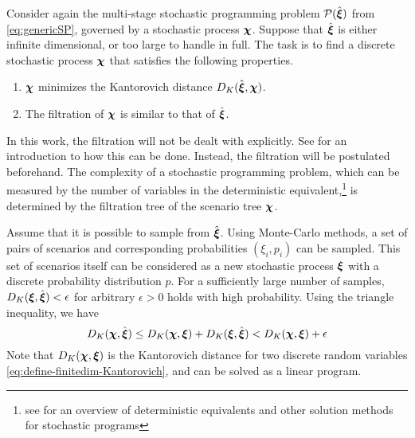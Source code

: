 Consider again the multi-stage stochastic programming problem $\mathcal{P}(\hat{\boldsymbol\xi})$ from \eqref{eq:genericSP}, governed by a stochastic process $\boldsymbol\chi$.
Suppose that $\hat{\boldsymbol\xi}$ is either infinite dimensional, or too large to handle in full.
The task is to find a discrete stochastic process $\boldsymbol\chi$ that satisfies the following properties.
\begin{enumerate}
\item $\boldsymbol\chi$ minimizes the Kantorovich distance $D_K(\hat{\boldsymbol\xi},\boldsymbol\chi)$.
\item The filtration of $\boldsymbol\chi$ is similar to that of $\hat{\boldsymbol\xi}$.
\end{enumerate}
In this work, the filtration will not be dealt with explicitly.
See  for an introduction to how this can be done.
Instead, the filtration will be postulated beforehand.
The complexity of a stochastic programming problem, which can be measured by the number of variables in the deterministic equivalent,\footnote{see  for an overview of deterministic equivalents and other solution methods for stochastic programs} is determined by the filtration tree of the scenario tree $\boldsymbol\chi$.

Assume that it is possible to sample from $\hat{\boldsymbol\xi}$.
Using Monte-Carlo methods, a set of pairs of scenarios and corresponding probabilities $(\xi_i,p_i)$ can be sampled.
This set of scenarios itself can be considered as a new stochastic process $\boldsymbol\xi$ with a discrete probability distribution $p$.
For a sufficiently large number of samples,  $D_K(\boldsymbol\xi,\hat{\boldsymbol\xi})<\epsilon$ for arbitrary $\epsilon>0$ holds with high probability.
Using the triangle inequality, we have
\begin{equation}
  \label{eq:triangle-montecarlo-kantoro}
  D_K(\boldsymbol\chi,\hat{\boldsymbol\xi}) \leq  D_K(\boldsymbol\chi, \boldsymbol\xi) + D_K(\boldsymbol\xi,\hat{\boldsymbol\xi})< D_K(\boldsymbol\chi,\boldsymbol\xi)+ \epsilon
\end{equation}
Note that $D_K(\boldsymbol\chi,\boldsymbol\xi)$ is the Kantorovich distance for two discrete random variables \eqref{eq:define-finitedim-Kantorovich}, and can be solved as a linear program.

